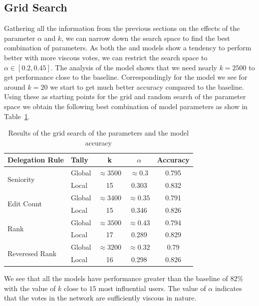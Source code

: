 \subsection{Grid Search}
Gathering all the information from the previous sections on the effects of the parameter $\alpha$ and $k$, we can narrow down the search space to find the best combination of parameters. As both the \localv and \globalv models show a tendency to perform better with more viscous votes, we can restrict the search space to $\alpha \in [0.2,0.45]$. The analysis of the \globalv model shows that we need nearly $k=2500$ to get performance close to the baseline. Correspondingly for the \localv model we see for around $k=20$ we start to get much better accuracy compared to the baseline. Using these as starting points for the grid and random search of the parameter space we obtain the following best combination of model parameters as show in Table~\ref{tab:grid-search}.
\begin{table}
    \centering
    \caption{Results of the grid search of the parameters and the model accuracy}
    \label{tab:grid-search}
    \begin{tabular}{llccc}
        \toprule
        Delegation Rule & Tally & k & $\alpha$ & Accuracy \\ \midrule
        \multirow{2}{*}{Seniority} & Global & $\approx 3500$ & $\approx 0.3$ & 0.795   \\ 
        \cmidrule{2-5}
        & Local & 15 & 0.303& 0.832  \\
        \midrule
        \multirow{2}{*}{Edit Count} & Global & $\approx 3400$ & $\approx 0.35$ & 0.791 \\
        \cmidrule{2-5}
        & Local & 15 & 0.346 & 0.826 \\
        \midrule
        \multirow{2}{*}{Rank} & Global & $\approx 3500$ & $\approx 0.43$ & 0.794\\
        \cmidrule{2-5}
        & Local & 17 & 0.289 & 0.829  \\
        \midrule
        \multirow{2}{*}{Reveresed Rank} & Global & $\approx 3200$ & $\approx 0.32$ & 0.79  \\
        \cmidrule{2-5}
        & Local & 16 & 0.298 & 0.826  \\
        \bottomrule
        \end{tabular}
\end{table}

We see that all the \localv models have performance greater than the baseline of $82\%$ with the value of $k$ close to $15$ most influential users. The value of $\alpha$ indicates that the votes in the network are sufficiently viscous in nature. 